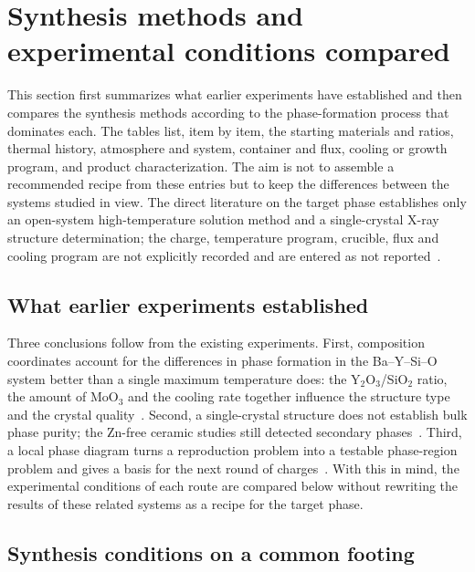 \section{Synthesis methods and experimental conditions compared}
\label{sec:condition-matrix}

This section first summarizes what earlier experiments have established and then compares the synthesis methods according to the phase-formation process that dominates each. The tables list, item by item, the starting materials and ratios, thermal history, atmosphere and system, container and flux, cooling or growth program, and product characterization. The aim is not to assemble a recommended recipe from these entries but to keep the differences between the systems studied in view. The direct literature on the target phase establishes only an open-system high-temperature solution method and a single-crystal X-ray structure determination; the charge, temperature program, crucible, flux and cooling program are not explicitly recorded and are entered as not reported~\cite{ababaikeri2024ba5y12zn}.

\subsection{What earlier experiments established}

Three conclusions follow from the existing experiments. First, composition coordinates account for the differences in phase formation in the Ba--Y--Si--O system better than a single maximum temperature does: the Y$_2$O$_3$\slash SiO$_2$ ratio, the amount of MoO$_3$ and the cooling rate together influence the structure type and the crystal quality~\cite{kolitsch2009crystal,wierzbickawieczorek2017high}. Second, a single-crystal structure does not establish bulk phase purity; the Zn-free ceramic studies still detected secondary phases~\cite{yamane2024microstructure,gulay2024navigation}. Third, a local phase diagram turns a reproduction problem into a testable phase-region problem and gives a basis for the next round of charges~\cite{gulay2024navigation}. With this in mind, the experimental conditions of each route are compared below without rewriting the results of these related systems as a recipe for the target phase.

\subsection{Synthesis conditions on a common footing}

